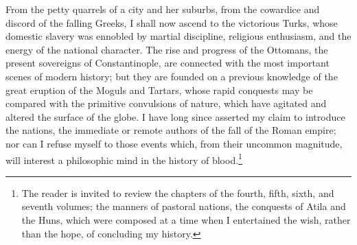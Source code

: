 From the petty quarrels of a city and her suburbs, from the cowardice and discord of the falling Greeks, I shall now ascend to the victorious Turks, whose domestic slavery was ennobled by martial discipline, religious enthusiasm, and the energy of the national character. The rise and progress of the Ottomans, the present sovereigns of Constantinople, are connected with the most important scenes of modern history; but they are founded on a previous knowledge of the great eruption of the Moguls and Tartars, whose rapid conquests may be compared with the primitive convulsions of nature, which have agitated and altered the surface of the globe. I have long since asserted my claim to introduce the nations, the immediate or remote authors of the fall of the Roman empire; nor can I refuse myself to those events which, from their uncommon magnitude, will interest a philosophic mind in the history of blood.\footnote{The reader is invited to review the chapters of the fourth, fifth, sixth, and seventh volumes; the manners of pastoral nations, the conquests of Atila and the Huns, which were composed at a time when I entertained the wish, rather than the hope, of concluding my history.}

